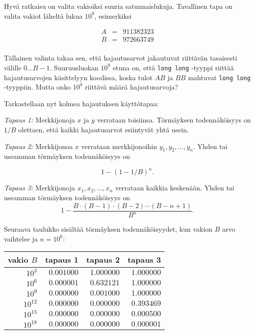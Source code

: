 Hyvä ratkaisu on valita vakioiksi suuria
satunnaislukuja. Tavallinen tapa on valita vakiot
läheltä lukua $10^9$, esimerkiksi

\[
\begin{array}{lcl}
A & = & 911382323 \\
B & = & 972663749 \\
\end{array}
\]

Tällainen valinta takaa sen,
että hajautusarvot jakautuvat
riittävän tasaisesti välille $0 \ldots B-1$.
Suuruusluokan $10^9$ etuna on,
että \texttt{long long} -tyyppi riittää
hajautusarvojen käsittelyyn koodissa,
koska tulot $AB$ ja $BB$ mahtuvat \texttt{long long} -tyyppiin.
Mutta onko $10^9$ riittävä määrä hajautusarvoja?

Tarkastellaan nyt kolmea hajautuksen käyttötapaa:

\textit{Tapaus 1:} Merkkijonoja $x$ ja $y$ verrataan toisiinsa.
Törmäyksen todennäköisyys on $1/B$ olettaen,
että kaikki hajautusarvot esiintyvät yhtä usein.

\textit{Tapaus 2:} Merkkijonoa $x$ verrataan merkkijonoihin
$y_1,y_2,\ldots,y_n$.
Yhden tai useamman törmäyksen todennäköisyys on

\[1-(1-1/B)^n.\]

\textit{Tapaus 3:} Merkkijonoja $x_1,x_2,\ldots,x_n$
verrataan kaikkia keskenään.
Yhden tai useamman törmäyksen todennäköisyys on
\[ 1 - \frac{B \cdot (B-1) \cdot (B-2) \cdots (B-n+1)}{B^n}.\]

Seuraava taulukko sisältää törmäyksen todennäköisyydet,
kun vakion $B$ arvo vaihtelee ja $n=10^6$:

\begin{center}
\begin{tabular}{rrrr}
vakio $B$ & tapaus 1 & tapaus 2 & tapaus 3 \\
\hline
$10^3$ & $0.001000$ & $1.000000$ & $1.000000$ \\
$10^6$ & $0.000001$ & $0.632121$ & $1.000000$ \\
$10^9$ & $0.000000$ & $0.001000$ & $1.000000$ \\
$10^{12}$ & $0.000000$ & $0.000000$ & $0.393469$ \\
$10^{15}$ & $0.000000$ & $0.000000$ & $0.000500$ \\
$10^{18}$ & $0.000000$ & $0.000000$ & $0.000001$ \\
\end{tabular}
\end{center}

